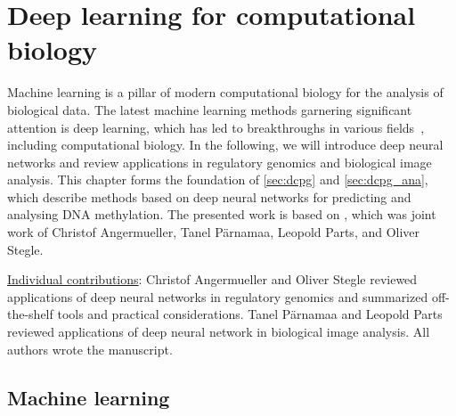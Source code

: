 

\chapter{Deep learning for computational biology} \label{sec:dl}

\ifpdf
    \graphicspath{{Chapter2/Figs/Raster/}{Chapter2/Figs/PDF/}{Chapter2/Figs/}}
\else
    \graphicspath{{Chapter2/Figs/Vector/}{Chapter2/Figs/}}
\fi

Machine learning is a pillar of modern computational biology for the analysis of biological data. The latest machine learning methods garnering significant attention is deep learning, which has led to breakthroughs in various fields~\citep{lecun_deep_2015,schmidhuber_deep_2015,bengio_representation_2013}, including computational biology. In the following, we will introduce deep neural networks and review applications in regulatory genomics and biological image analysis. This chapter forms the foundation of \cref{sec:dcpg} and \cref{sec:dcpg_ana}, which describe methods based on deep neural networks for predicting and analysing DNA methylation. The presented work is based on \citet{angermueller_deep_2016}, which was joint work of Christof Angermueller, Tanel P\"arnamaa, Leopold Parts, and Oliver Stegle.

\begin{center}
\begin{minipage}{.9\linewidth}
\underline{Individual contributions}: Christof Angermueller and Oliver Stegle reviewed applications of deep neural networks in regulatory genomics and summarized off-the-shelf tools and practical considerations. Tanel P\"arnamaa and Leopold Parts reviewed applications of deep neural network in biological image analysis. All authors wrote the manuscript.
\end{minipage}
\end{center}

\section{Machine learning}

